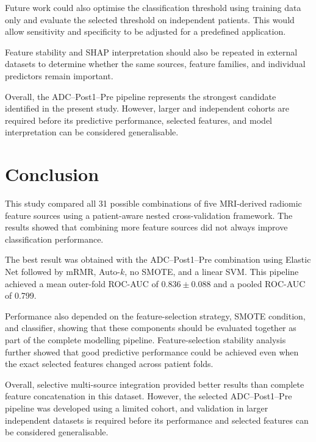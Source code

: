 \documentclass[12pt,twocolumn]{article}
\begin{document}
Future work could also optimise the classification threshold using
training data only and evaluate the selected threshold on independent
patients. This would allow sensitivity and specificity to be adjusted
for a predefined application.

Feature stability and SHAP interpretation should also be repeated in
external datasets to determine whether the same sources, feature
families, and individual predictors remain important.

Overall, the ADC--Post1--Pre pipeline represents the strongest
candidate identified in the present study. However, larger and
independent cohorts are required before its predictive performance,
selected features, and model interpretation can be considered
generalisable.










\section{Conclusion}
\label{sec:conclusion}

This study compared all 31 possible combinations of five MRI-derived
radiomic feature sources using a patient-aware nested cross-validation
framework. The results showed that combining more feature sources did
not always improve classification performance.

The best result was obtained with the ADC--Post1--Pre combination using
Elastic Net followed by mRMR, Auto-\(k\), no SMOTE, and a linear SVM.
This pipeline achieved a mean outer-fold ROC-AUC of
\(0.836 \pm 0.088\) and a pooled ROC-AUC of 0.799.

Performance also depended on the feature-selection strategy, SMOTE
condition, and classifier, showing that these components should be
evaluated together as part of the complete modelling pipeline.
Feature-selection stability analysis further showed that good
predictive performance could be achieved even when the exact selected
features changed across patient folds.

Overall, selective multi-source integration provided better results
than complete feature concatenation in this dataset. However, the
selected ADC--Post1--Pre pipeline was developed using a limited cohort,
and validation in larger independent datasets is required before its
performance and selected features can be considered generalisable.
\end{document}
